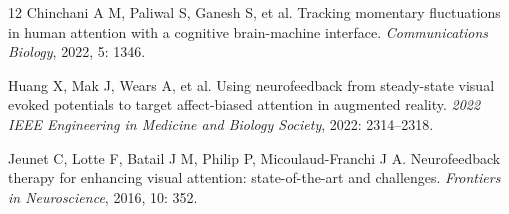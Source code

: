 \documentclass[UTF8,a4paper,zihao=5]{ctexart}
\begin{document}
\begin{thebibliography}{12}
Chinchani A M, Paliwal S, Ganesh S, et al.
Tracking momentary fluctuations in human attention with a cognitive brain-machine interface.
\textit{Communications Biology}, 2022, 5: 1346.

Huang X, Mak J, Wears A, et al.
Using neurofeedback from steady-state visual evoked potentials to target affect-biased attention in augmented reality.
\textit{2022 IEEE Engineering in Medicine and Biology Society}, 2022: 2314--2318.

Jeunet C, Lotte F, Batail J M, Philip P, Micoulaud-Franchi J A.
Neurofeedback therapy for enhancing visual attention: state-of-the-art and challenges.
\textit{Frontiers in Neuroscience}, 2016, 10: 352.
\end{thebibliography}
\end{document}
